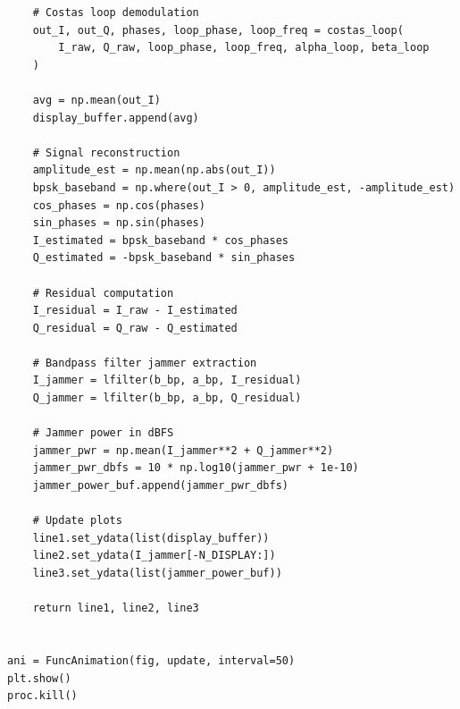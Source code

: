 \documentclass{article}
\begin{document}
\begin{verbatim}
    # Costas loop demodulation
    out_I, out_Q, phases, loop_phase, loop_freq = costas_loop(
        I_raw, Q_raw, loop_phase, loop_freq, alpha_loop, beta_loop
    )

    avg = np.mean(out_I)
    display_buffer.append(avg)

    # Signal reconstruction
    amplitude_est = np.mean(np.abs(out_I))
    bpsk_baseband = np.where(out_I > 0, amplitude_est, -amplitude_est)
    cos_phases = np.cos(phases)
    sin_phases = np.sin(phases)
    I_estimated = bpsk_baseband * cos_phases
    Q_estimated = -bpsk_baseband * sin_phases

    # Residual computation
    I_residual = I_raw - I_estimated
    Q_residual = Q_raw - Q_estimated

    # Bandpass filter jammer extraction
    I_jammer = lfilter(b_bp, a_bp, I_residual)
    Q_jammer = lfilter(b_bp, a_bp, Q_residual)

    # Jammer power in dBFS
    jammer_pwr = np.mean(I_jammer**2 + Q_jammer**2)
    jammer_pwr_dbfs = 10 * np.log10(jammer_pwr + 1e-10)
    jammer_power_buf.append(jammer_pwr_dbfs)

    # Update plots
    line1.set_ydata(list(display_buffer))
    line2.set_ydata(I_jammer[-N_DISPLAY:])
    line3.set_ydata(list(jammer_power_buf))

    return line1, line2, line3


ani = FuncAnimation(fig, update, interval=50)
plt.show()
proc.kill()
\end{verbatim}
\end{document}
